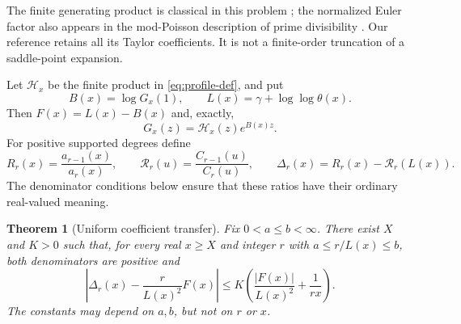 \documentclass[11pt]{article}
\newtheorem{theorem}{Theorem}[section]
\theoremstyle{definition}
\begin{document}
The finite generating product is classical in this problem
\cite[(1.6)]{ET}; the normalized Euler factor also appears in the
mod-Poisson description of prime divisibility \cite[\S4]{KN}.
Our reference retains all its Taylor coefficients. It is not a
finite-order truncation of a saddle-point expansion.

Let $\mathcal H_x$ be the finite product in \eqref{eq:profile-def}, and put
\begin{equation}\label{eq:two-clocks}
 B(x)=\log G_x(1),\qquad
 L(x)=\gamma+\log\log\theta(x).
\end{equation}
Then $F(x)=L(x)-B(x)$ and, exactly,
\begin{equation}\label{eq:finite-factorization}
 G_x(z)=\mathcal H_x(z)e^{B(x)z}.
\end{equation}
For positive supported degrees define
\[
 R_r(x)=\frac{a_{r-1}(x)}{a_r(x)},\qquad
 \mathcal R_r(u)=\frac{C_{r-1}(u)}{C_r(u)},\qquad
 \Delta_r(x)=R_r(x)-\mathcal R_r(L(x)).
\]
The denominator conditions below ensure that these ratios have their
ordinary real-valued meaning.

\begin{theorem}[Uniform coefficient transfer]\label{thm:linearization}
Fix $0<a\le b<\infty$. There exist $X$ and $K>0$ such that, for every
real $x\ge X$ and integer $r$ with $a\le r/L(x)\le b$, both denominators
are positive and
\begin{equation}\label{eq:linearization}
 \left|\Delta_r(x)-\frac r{L(x)^2}F(x)\right|
 \le K\left(\frac{|F(x)|}{L(x)^2}+\frac1{rx}\right).
\end{equation}
The constants may depend on $a,b$, but not on $r$ or $x$.
\end{theorem}
\end{document}
